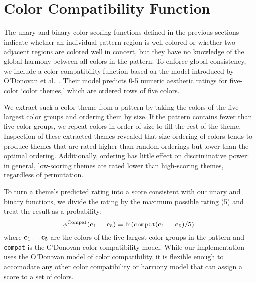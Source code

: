 \section{Color Compatibility Function}
\label{sec:colorCompat}

The unary and binary color scoring functions defined in the previous sections indicate whether an individual pattern region is well-colored or whether two adjacent regions are colored well in concert, but they have no knowledge of the global harmony between all colors in the pattern. To enforce global consistency, we include a color compatibility function based on the model introduced by O'Donovan et al.~. Their model predicts 0-5 numeric aesthetic ratings for five-color `color themes,' which are ordered rows of five colors. 

We extract such a color theme from a pattern by taking the colors of the five largest color groups and ordering them by size. If the pattern contains fewer than five color groups, we repeat colors in order of size to fill the rest of the theme. Inspection of these extracted themes revealed that size-ordering of colors tends to produce themes that are rated higher than random orderings but lower than the optimal ordering. Additionally, ordering has little effect on discriminative power: in general, low-scoring themes are rated lower than high-scoring themes, regardless of permutation.

To turn a theme's predicted rating into a score consistent with our unary and binary functions, we divide the rating by the maximum possible rating (5) and treat the result as a probability:
\begin{equation*}
\phi^{\textrm{Compat}}(\mathbf{c}_1 \ldots \mathbf{c}_5) = \ln(\texttt{compat}(\mathbf{c}_1 \ldots \mathbf{c}_5) / 5)
\end{equation*}
where $\mathbf{c}_1 \ldots \mathbf{c}_5$ are the colors of the five largest color groups in the pattern and \texttt{compat} is the O'Donovan color compatibility model. While our implementation uses the O'Donovan model of color compatibility, it is flexible enough to accomodate any other color compatibility or harmony model that can assign a score to a set of colors.

